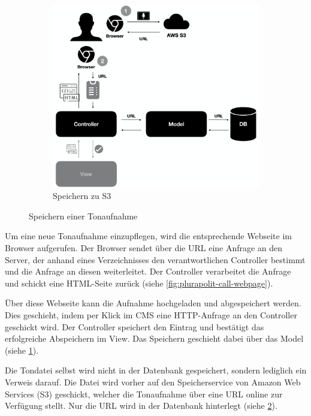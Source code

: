 \begin{figure}
\begin{subfigure}[a]{0.4\linewidth}
		\label{fig:plurapolit-save-sounddatei}
	\end{subfigure}
	\begin{subfigure}[b]{0.4\linewidth}
		\includegraphics[width=\linewidth]{Assets/PluraPolit-Softwaresystem.003}
		\caption{Speichern zu S3}
		\label{fig:plurapolit-save-to-s3}
	\end{subfigure}
	\caption{Speichern einer Tonaufnahme}
	\label{fig:coffee}
\end{figure}

Um eine neue Tonaufnahme einzupflegen, wird die entsprechende Webseite im Browser aufgerufen. Der Browser sendet über die URL eine Anfrage an den Server, der anhand eines Verzeichnisses den verantwortlichen Controller bestimmt und die Anfrage an diesen weiterleitet.  Der Controller verarbeitet die Anfrage und schickt eine HTML-Seite zurück (siehe \cref{fig:plurapolit-call-webpage}).

Über diese Webseite kann die Aufnahme hochgeladen und abgespeichert werden. 
Dies geschieht, indem per Klick im CMS eine HTTP-Anfrage an den Controller geschickt wird. Der Controller speichert den Eintrag und bestätigt das erfolgreiche Abspeichern im View. Das Speichern geschieht dabei über das Model (siehe \cref{fig:plurapolit-save-sounddatei}).

Die Tondatei selbst wird nicht in der Datenbank gespeichert, sondern lediglich ein Verweis darauf. 
Die Datei wird vorher auf den Speicherservice von Amazon Web Services (S3) geschickt, welcher die Tonaufnahme über eine URL online zur Verfügung stellt. Nur die URL wird in der Datenbank hinterlegt (siehe \cref{fig:plurapolit-save-to-s3}).

